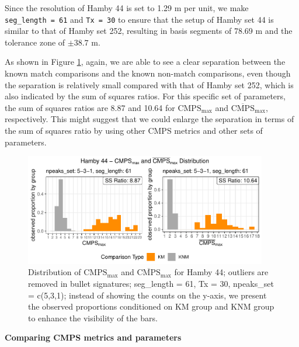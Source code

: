 Since the resolution of Hamby 44 is set to 1.29 \textmu m per unit, we
make \texttt{seg\_length\ =\ 61} and \texttt{Tx\ =\ 30} to ensure that
the setup of Hamby set 44 is similar to that of Hamby set 252, resulting
in basis segments of 78.69 \textmu m and the tolerance zone of
\(\pm 38.7\) \textmu m.

As shown in Figure \ref{fig:result1-44}, again, we are able to see a
clear separation between the known match comparisons and the known
non-match comparisons, even though the separation is relatively small
compared with that of Hamby set 252, which is also indicated by the sum
of squares ratios. For this specific set of parameters, the sum of
squares ratios are 8.87 and 10.64 for \(\mathrm{CMPS_{max}}\) and
\(\mathrm{\overline{CMPS}_{max}}\), respectively. This might suggest
that we could enlarge the separation in terms of the sum of squares
ratio by using other CMPS metrics and other sets of parameters.

\begin{Schunk}
\begin{figure}

{\centering \includegraphics[width=400px]{ju-hofmann_files/figure-latex/result1-44-1} 

}

\caption[Distribution of $\mathrm{CMPS_{max}}$ and $\mathrm{\overline{CMPS}_{max}}$ for Hamby 44]{Distribution of $\mathrm{CMPS_{max}}$ and $\mathrm{\overline{CMPS}_{max}}$ for Hamby 44; outliers are removed in bullet signatures; seg\_length = 61, Tx = 30, npeaks\_set = c(5,3,1); instead of showing the counts on the y-axis, we present the observed proportions conditioned on KM group and KNM group to enhance the visibility of the bars. }\label{fig:result1-44}
\end{figure}
\end{Schunk}

\textbf{Comparing CMPS metrics and parameters}

